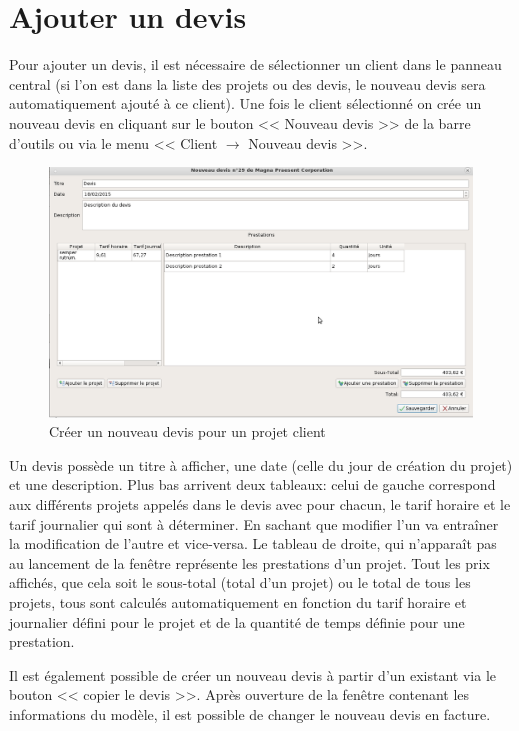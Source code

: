 \section{Ajouter un devis}
\label{ch:ajoutDevis}
Pour ajouter un devis, il est nécessaire de sélectionner un client dans le panneau central (si l'on est dans la liste des projets ou des devis, le nouveau devis sera automatiquement ajouté à ce client). Une fois le client sélectionné on crée un nouveau devis en cliquant sur le bouton << Nouveau devis >> de la barre d'outils ou via le menu << Client $\rightarrow$ Nouveau devis >>. 
\begin{figure}[H]
	\centering
	\includegraphics[width=17cm]{screens/creerDevis.png}
	\caption{Créer un nouveau devis pour un projet client}
	\label{fig:creerDevis}
\end{figure}
Un devis possède un titre à afficher, une date (celle du jour de création du projet) et une description. Plus bas arrivent deux tableaux: celui de gauche correspond aux différents projets appelés dans le devis avec pour chacun, le tarif horaire et le tarif journalier qui sont à déterminer. En sachant que modifier l'un va entraîner la modification de l'autre et vice-versa. Le tableau de droite, qui n'apparaît pas au lancement de la fenêtre représente les prestations d'un projet. Tout les prix affichés, que cela soit le sous-total (total d'un projet) ou le total de tous les projets, tous sont calculés automatiquement en fonction du tarif horaire et journalier défini pour le projet et de la quantité de temps définie pour une prestation.

Il est également possible de créer un nouveau devis à partir d'un existant via le bouton << copier le devis >>. Après ouverture de la fenêtre contenant les informations du modèle, il est possible de changer le nouveau devis en facture. 
